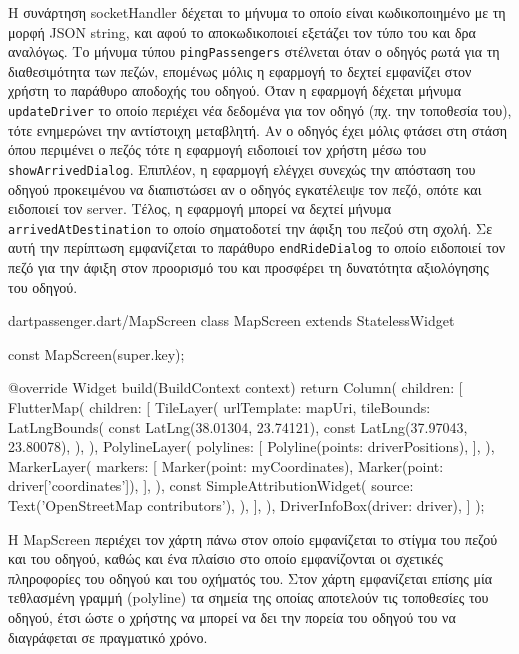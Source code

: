 \documentclass[../thesis.tex]{subfiles}
\begin{document}
Η συνάρτηση socketHandler δέχεται το μήνυμα το οποίο είναι κωδικοποιημένο με τη μορφή JSON string, και αφού το αποκωδικοποιεί εξετάζει τον τύπο του και δρα αναλόγως.
Το μήνυμα τύπου \texttt{pingPassengers} στέλνεται όταν ο οδηγός ρωτά για τη διαθεσιμότητα των πεζών, επομένως μόλις η εφαρμογή το δεχτεί εμφανίζει στον χρήστη το παράθυρο αποδοχής του οδηγού.
Όταν η εφαρμογή δέχεται μήνυμα \texttt{updateDriver} το οποίο περιέχει νέα δεδομένα για τον οδηγό (πχ. την τοποθεσία του), τότε ενημερώνει την αντίστοιχη μεταβλητή.
Αν ο οδηγός έχει μόλις φτάσει στη στάση όπου περιμένει ο πεζός τότε η εφαρμογή ειδοποιεί τον χρήστη μέσω του \texttt{showArrivedDialog}.
Επιπλέον, η εφαρμογή ελέγχει συνεχώς την απόσταση του οδηγού προκειμένου να διαπιστώσει αν ο οδηγός εγκατέλειψε τον πεζό, οπότε και ειδοποιεί τον server.
Τέλος, η εφαρμογή μπορεί να δεχτεί μήνυμα \texttt{arrivedAtDestination} το οποίο σηματοδοτεί την άφιξη του πεζού στη σχολή.
Σε αυτή την περίπτωση εμφανίζεται το παράθυρο \texttt{endRideDialog} το οποίο ειδοποιεί τον πεζό για την άφιξη στον προορισμό του και προσφέρει τη δυνατότητα αξιολόγησης του οδηγού.


\begin{codeblock}{dart}{passenger.dart/MapScreen}
  class MapScreen extends StatelessWidget {
  const MapScreen({super.key});

  @override
  Widget build(BuildContext context) {
    return Column(
      children: [
        FlutterMap(
          children: [
            TileLayer(
              urlTemplate: mapUri,
              tileBounds: LatLngBounds(
                const LatLng(38.01304, 23.74121),
                const LatLng(37.97043, 23.80078),
              ),
            ),
            PolylineLayer(
              polylines: [
                Polyline(points: driverPositions),
              ],
            ),
            MarkerLayer(
              markers: [
                Marker(point: myCoordinates),
                Marker(point: driver['coordinates']), 
              ],
            ),
            const SimpleAttributionWidget(
              source: Text('OpenStreetMap contributors'),
            ),
          ],
        ),
        DriverInfoBox(driver: driver),
      ]
    );
  }
}
\end{codeblock}

Η MapScreen περιέχει τον χάρτη πάνω στον οποίο εμφανίζεται το στίγμα του πεζού και του οδηγού, καθώς και ένα πλαίσιο στο οποίο εμφανίζονται οι σχετικές πληροφορίες του οδηγού και του οχήματός του.
Στον χάρτη εμφανίζεται επίσης μία τεθλασμένη γραμμή (polyline) τα σημεία της οποίας αποτελούν τις τοποθεσίες του οδηγού, έτσι ώστε ο χρήστης να μπορεί να δει την πορεία του οδηγού του να διαγράφεται σε πραγματικό χρόνο.
\end{document}
